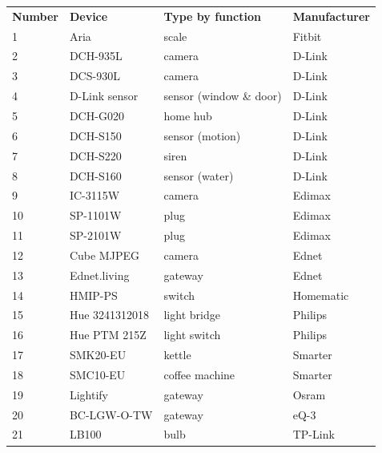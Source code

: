 \documentclass[twocolumn,10pt]{article}
\begin{document}
\begin{table}[]
\centering
\scriptsize
\begin{tabular}{llll}
\textbf{Number} & \textbf{Device}                     & \textbf{Type by function} & \textbf{Manufacturer} \\
1      & Aria                       & scale            & Fitbit       \\
2      & DCH-935L                   & camera           & D-Link       \\
3      & DCS-930L                   & camera           & D-Link       \\
4      & D-Link sensor           & sensor (window \& door) & D-Link       \\
5      & DCH-G020                   & home hub         & D-Link       \\
6      & DCH-S150                   & sensor (motion)  & D-Link       \\
7      & DCH-S220                   & siren            & D-Link       \\
8      & DCH-S160                   & sensor (water)   & D-Link       \\
9      & IC-3115W                   & camera           & Edimax       \\
10     & SP-1101W                   & plug             & Edimax       \\
11     & SP-2101W                   & plug             & Edimax       \\
12     & Cube MJPEG                 & camera           & Ednet        \\
13     & Ednet.living               & gateway          & Ednet        \\
14     & HMIP-PS                    & switch           & Homematic    \\
15     & Hue 3241312018             & light bridge     & Philips      \\
16     & Hue PTM 215Z               & light switch     & Philips      \\
17     & SMK20-EU                   & kettle           & Smarter      \\
18     & SMC10-EU                   & coffee machine   & Smarter      \\
19     & Lightify                   & gateway          & Osram        \\
20     & BC-LGW-O-TW                & gateway          & eQ-3         \\
21     & LB100                      & bulb             & TP-Link      \\

\end{tabular}
\end{table}
\end{document}
